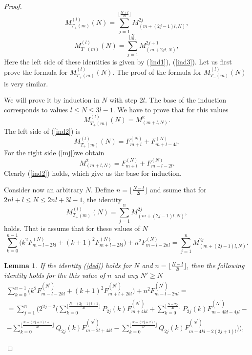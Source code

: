 \documentclass[11pt]{amsart}
\newtheorem{lemma}[theorem]{Lemma}
\begin{document}
\begin{proof}
	\begin{equation*}
	M^{(l)}_{T_{+}(m)}(N)=\sum_{j=1}^{\lfloor\frac{N+l}{2l}\rfloor}M^{2j}_{(m+(2j-1)l,N)},
	\end{equation*}
	\begin{equation*}
	M^{(l)}_{T_{-}(m)}(N)=\sum_{j=1}^{\lfloor\frac{N}{2l}\rfloor}M^{2j+1}_{(m+2jl,N)},
	\end{equation*}
	Here the left side of these identities is given by  (\ref{ind1}), (\ref{ind3}). Let us first prove the
	formula for $M^{(l)}_{T_{+}(m)}(N)$. The proof of the formula for $M^{(l)}_{T_{-}(m)}(N)$ is very similar.
	
	We will prove it by induction in $N$ with step $2l$. The base of the induction corresponds to values
	$l\leq N\leq3l-1$. We have to prove that for this values
	\begin{equation}\label{ind2}
	M^{(l)}_{T_{+}(m)}(N)=M^2_{(m+l,N)}.
	\end{equation}
	The left side of (\ref{ind2}) is
	\begin{equation*}
	M^{(l)}_{T_{+}(m)}(N)=F^{(N)}_{m+l}+F^{(N)}_{m+l-4l},
	\end{equation*}
	For the right side (\ref{mj})we obtain
	\begin{equation*}
	M^2_{(m+l,N)}=F^{(N)}_{m+l}+F^{(N)}_{m-l-2l}.
	\end{equation*}
	Clearly (\ref{ind2}) holds, which give us the base for induction.
	
	Consider now an arbitrary $N$. Define $n=\lfloor\frac{N-l}{2l}\rfloor$ and ssume that for 
	$2nl+l\leq N\leq2nl+3l-1$, the identity 
	\begin{equation*}
	M^{(l)}_{T_{+}(m)}(N)=\sum_{j=1}^{n}M^{2j}_{(m+(2j-1)l,N)},
	\end{equation*}
	holds. That is assume that for these values of $N$
	\begin{equation}\label{ded}
	\sum_{k=0}^{n-1}\big(k^2F^{(N)}_{m-l-2kl}+(k+1)^2 F^{(N)}_{m+l+2kl}\big)+n^2F^{(N)}_{m-l-2nl}=\sum_{j=1}^{n}M^{2j}_{(m+(2j-1)l,N)}.
	\end{equation}
	
	\begin{lemma}\label{lemmaqqbb} If the identity (\ref{ded}) holds for $N$ and $n=\lfloor\frac{N-l}{2l}\rfloor$, then 
		the following identity holds for the this value of $n$ and any $N'\geq N$ 
		\begin{eqnarray}\label{qwerty}
		\sum_{k=0}^{n-1}\big(k^2F^{(N^\prime)}_{m-l-2kl}+(k+1)^2 F^{(N^\prime)}_{m+l+2kl}\big)+n^2F^{(N^\prime)}_{m-l-2nl}=\\
		=\sum_{j=1}^{n}\Big(
		2^{2j-2}\big(\sum_{k=0}^{\lfloor\frac{N-(2j-1)l+1}{4l}\rfloor}P_{2j}(k) F^{(N^\prime)}_{m+4kl}+\sum_{k=0}^{\lfloor\frac{N-2jl}{4l}\rfloor}P_{2j}(k)F^{(N^\prime)}_{m-4kl-4jl} - \nonumber\\
		-\sum_{k=0}^{\lfloor\frac{N-(2j+1)l+1}{4l}\rfloor}Q_{2j}(k)F^{(N^\prime)}_{m+2l+4kl}-\sum_{k=0}^{\lfloor\frac{N-(2j+2)l}{4l}\rfloor}Q_{2j}(k)F^{(N^\prime)}_{m-4kl-2(2j+1)l} \big)\Big)\nonumber,
		\end{eqnarray}
		

\end{lemma}
\end{proof}
\end{document}
